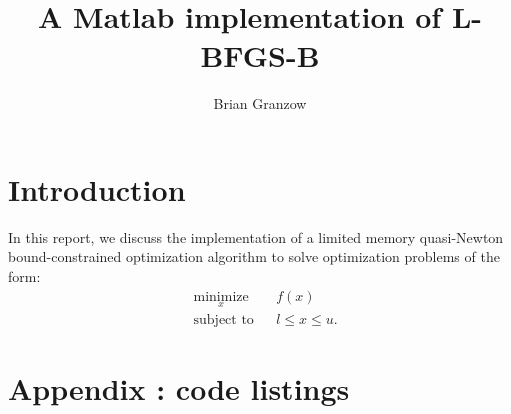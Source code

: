 \documentclass[11pt]{article}
\title{A Matlab implementation of L-BFGS-B}
\author{Brian Granzow}
\date{}
\begin{document}
\maketitle

\section{Introduction}
In this report, we discuss the implementation of a limited
memory quasi-Newton bound-constrained optimization algorithm
to solve optimization problems of the form:
\begin{equation}
\begin{aligned}
& \underset{x}{\text{minimize}}
& & f(x) \\
& \text{subject to}
& & l \leq x \leq u.
\end{aligned}
\end{equation}

\newpage

\section{Appendix : code listings}


\newpage

\newpage


\newpage


\newpage

\newpage

\end{document}
